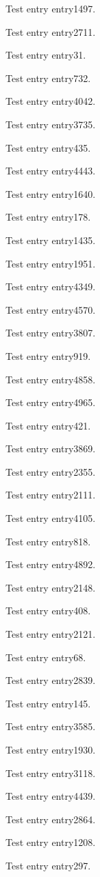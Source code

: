 Test entry \gls{entry1497}.

Test entry \gls{entry2711}.

Test entry \gls{entry31}.

Test entry \gls{entry732}.

Test entry \gls{entry4042}.

Test entry \gls{entry3735}.

Test entry \gls{entry435}.

Test entry \gls{entry4443}.

Test entry \gls{entry1640}.

Test entry \gls{entry178}.

Test entry \gls{entry1435}.

Test entry \gls{entry1951}.

Test entry \gls{entry4349}.

Test entry \gls{entry4570}.

Test entry \gls{entry3807}.

Test entry \gls{entry919}.

Test entry \gls{entry4858}.

Test entry \gls{entry4965}.

Test entry \gls{entry421}.

Test entry \gls{entry3869}.

Test entry \gls{entry2355}.

Test entry \gls{entry2111}.

Test entry \gls{entry4105}.

Test entry \gls{entry818}.

Test entry \gls{entry4892}.

Test entry \gls{entry2148}.

Test entry \gls{entry408}.

Test entry \gls{entry2121}.

Test entry \gls{entry68}.

Test entry \gls{entry2839}.

Test entry \gls{entry145}.

Test entry \gls{entry3585}.

Test entry \gls{entry1930}.

Test entry \gls{entry3118}.

Test entry \gls{entry4439}.

Test entry \gls{entry2864}.

Test entry \gls{entry1208}.

Test entry \gls{entry297}.

